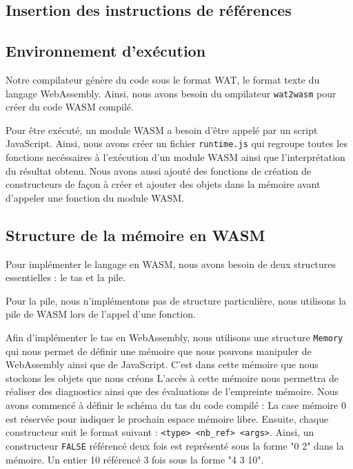 \documentclass{rapportECL}
\begin{document}
\subsection{Insertion des instructions de références}


\subsection{Environnement d'exécution}

Notre compilateur génère du code sous le format WAT, le format texte du langage WebAssembly. Ainsi, nous avons besoin
du ompilateur \verb|wat2wasm| pour créer du code WASM compilé.

Pour être exécuté, un module WASM a besoin d'être appelé par un script JavaScript. Ainsi, nous avons créer un fichier 
\verb|runtime.js| qui regroupe toutes les fonctions necéssaires à l'exécution d'un module WASM ainsi que l'interprétation
du résultat obtenu. Nous avons aussi ajouté des fonctions de création de constructeurs de façon à créer et ajouter des objets 
dans la mémoire avant d'appeler une fonction du module WASM.

\subsection{Structure de la mémoire en WASM}

Pour implémenter le langage en WASM, nous avons besoin de deux structures essentielles : le tas et la pile.

\medskip

Pour la pile, nous n'implémentons pas de structure particulière, nous utilisons la pile de WASM lors de l'appel d'une fonction.

\medskip

Afin d'implémenter le tas en WebAssembly, nous utilisons une structure \verb|Memory| qui nous permet de définir une mémoire que 
nous pouvons manipuler de WebAssembly ainsi que de JavaScript.
C'est dans cette mémoire que nous stockons les objets que nous créons
L'accès à cette mémoire nous permettra de réaliser des diagnostics ainsi que des évaluations de l'empreinte mémoire.
Nous avons commencé à définir le schéma du tas du code compilé :
La case mémoire 0 est réservée pour indiquer le prochain espace mémoire libre.
Ensuite, chaque constructeur suit le format suivant : \verb|<type> <nb_ref> <args>|. Ainsi, un constructeur \verb|FALSE| référencé 
deux fois est représenté sous la forme "0 2" dans la mémoire. Un entier 10 référencé 3 fois sous la forme "4 3 10".
\end{document}
